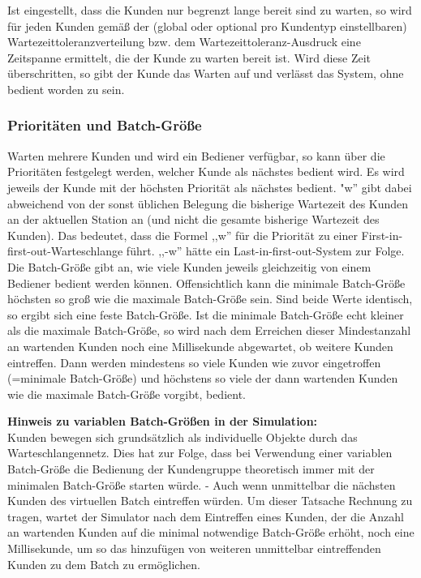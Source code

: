 Ist eingestellt, dass die Kunden nur begrenzt lange bereit sind zu warten, so wird für jeden Kunden gemäß der (global oder optional
pro Kundentyp einstellbaren) Wartezeittoleranzverteilung bzw. dem Wartezeittoleranz-Ausdruck eine Zeitspanne ermittelt, die der
Kunde zu warten bereit ist. Wird diese Zeit überschritten, so gibt der Kunde das Warten auf und verlässt das System,
ohne bedient worden zu sein.

\subsubsection*{Prioritäten und Batch-Größe}

Warten mehrere Kunden und wird ein Bediener verfügbar, so kann über die Prioritäten festgelegt werden, welcher Kunde als nächstes
bedient wird. Es wird jeweils der Kunde mit der höchsten Priorität als nächstes bedient.
"w'' gibt dabei abweichend von der sonst üblichen Belegung die bisherige Wartezeit des Kunden an der aktuellen Station an (und nicht
die gesamte bisherige Wartezeit des Kunden). Das bedeutet, dass die Formel ,,w'' für die Priorität zu einer
First-in-first-out-Warteschlange führt. ,,-w'' hätte ein Last-in-first-out-System zur Folge.
Die Batch-Größe gibt an, wie viele Kunden jeweils gleichzeitig von einem Bediener bedient werden können. Offensichtlich kann die
minimale Batch-Größe höchsten so groß wie die maximale Batch-Größe sein. Sind beide Werte identisch, so ergibt sich eine feste
Batch-Größe. Ist die minimale Batch-Größe echt kleiner als die maximale Batch-Größe, so wird nach dem Erreichen dieser Mindestanzahl
an wartenden Kunden noch eine Millisekunde abgewartet, ob weitere Kunden eintreffen. Dann werden mindestens so viele Kunden wie zuvor
eingetroffen (=minimale Batch-Größe) und höchstens so viele der dann wartenden Kunden wie die maximale Batch-Größe vorgibt, bedient. 

\textbf{Hinweis zu variablen Batch-Größen in der Simulation:}~\\
Kunden bewegen sich grundsätzlich als individuelle Objekte durch das Warteschlangennetz. Dies hat zur Folge, dass bei Verwendung
einer variablen Batch-Größe die Bedienung der Kundengruppe theoretisch immer mit der minimalen Batch-Größe starten würde. - Auch
wenn unmittelbar die nächsten Kunden des virtuellen Batch eintreffen würden. Um dieser Tatsache Rechnung zu tragen, wartet der
Simulator nach dem Eintreffen eines Kunden, der die Anzahl an wartenden Kunden auf die minimal notwendige Batch-Größe erhöht,
noch eine Millisekunde, um so das hinzufügen von weiteren unmittelbar eintreffenden Kunden zu dem Batch zu ermöglichen.

